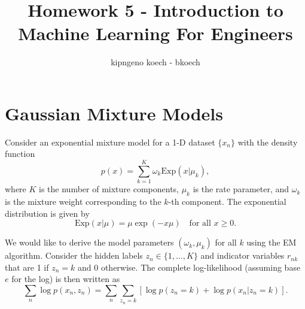 \documentclass[a3paper,12pt]{extarticle} %
\begin{document}
\author{kipngeno koech - bkoech}
\title{Homework 5 - Introduction to Machine Learning For Engineers}   
\maketitle

\medskip
\maketitle
\section{Gaussian Mixture Models}
Consider an exponential mixture model for a 1-D dataset $\{x_n\}$ with the density function
\[
p(x) = \sum_{k=1}^K \omega_k \text{Exp}(x|\mu_k),
\]
where $K$ is the number of mixture components, $\mu_k$ is the rate parameter, and $\omega_k$ is the mixture weight corresponding to the $k$-th component. The exponential distribution is given by
\[
\text{Exp}(x|\mu) = \mu \exp(-x\mu) \quad \text{for all } x \geq 0. \tag{1}
\]

We would like to derive the model parameters $(\omega_k, \mu_k)$ for all $k$ using the EM algorithm. Consider the hidden labels $z_n \in \{1, \ldots, K\}$ and indicator variables $r_{nk}$ that are 1 if $z_n = k$ and 0 otherwise. The complete log-likelihood (assuming base $e$ for the log) is then written as
\[
\sum_n \log p(x_n, z_n) = \sum_n \sum_{z_n=k} \left[\log p(z_n = k) + \log p(x_n|z_n = k)\right].
\]
\end{document}

